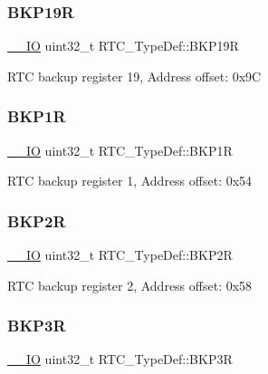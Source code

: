 \subsubsection{\texorpdfstring{B\+K\+P19R}{BKP19R}}
{\footnotesize\ttfamily \hyperlink{core__sc300_8h_aec43007d9998a0a0e01faede4133d6be}{\+\_\+\+\_\+\+IO} uint32\+\_\+t R\+T\+C\+\_\+\+Type\+Def\+::\+B\+K\+P19R}

R\+TC backup register 19, Address offset\+: 0x9C \mbox{\label{struct_r_t_c___type_def_a5439bfca3708c6b8be6a74626f06111f}} 
\subsubsection{\texorpdfstring{B\+K\+P1R}{BKP1R}}
{\footnotesize\ttfamily \hyperlink{core__sc300_8h_aec43007d9998a0a0e01faede4133d6be}{\+\_\+\+\_\+\+IO} uint32\+\_\+t R\+T\+C\+\_\+\+Type\+Def\+::\+B\+K\+P1R}

R\+TC backup register 1, Address offset\+: 0x54 \mbox{\label{struct_r_t_c___type_def_aa845c401b24d2ef1049f489f26d35626}} 
\subsubsection{\texorpdfstring{B\+K\+P2R}{BKP2R}}
{\footnotesize\ttfamily \hyperlink{core__sc300_8h_aec43007d9998a0a0e01faede4133d6be}{\+\_\+\+\_\+\+IO} uint32\+\_\+t R\+T\+C\+\_\+\+Type\+Def\+::\+B\+K\+P2R}

R\+TC backup register 2, Address offset\+: 0x58 \mbox{\label{struct_r_t_c___type_def_ac3802c3b17482a0667fb34ddd1863434}} 
\subsubsection{\texorpdfstring{B\+K\+P3R}{BKP3R}}
{\footnotesize\ttfamily \hyperlink{core__sc300_8h_aec43007d9998a0a0e01faede4133d6be}{\+\_\+\+\_\+\+IO} uint32\+\_\+t R\+T\+C\+\_\+\+Type\+Def\+::\+B\+K\+P3R}


